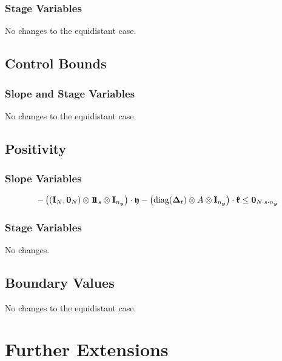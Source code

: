 \documentclass{article}
\newcommand{\kron}{\otimes}%
\newcommand{\diag}{\mathop{\mathrm{diag}}}%
\newcommand{\vectorfont}[1]{\boldsymbol{#1}}%
\newcommand{\greekvectorfont}[1]{\boldsymbol{#1}}%
\newcommand{\matrixfont}[1]{\mathbf{#1}}%
\newcommand{\yvec}{\vectorfont{y}}
\newcommand{\Deltavec}{\greekvectorfont{\Delta}}
\newcommand{\kfrakvec}{\vectorfont{\mathfrak{k}}}
\newcommand{\yfrakvec}{\vectorfont{\mathfrak{y}}}
\newcommand{\nullvec}{\greekvectorfont{0}}
\newcommand{\einsvec}{\vectorfont{1}\negthinspace\negthinspace\vectorfont{1}} %
\newcommand{\Imat}{\matrixfont{I}}%
\begin{document}
\subsubsection*{Stage Variables}
No changes to the equidistant case.


\subsection*{Control Bounds}
\subsubsection*{Slope and Stage Variables}
No changes to the equidistant case.


\subsection*{Positivity}
\subsubsection*{Slope Variables}
\[
- \left((\Imat_N, \nullvec_N)  \kron \einsvec_s  \kron \Imat_{n_{\yvec}}   \right)\cdot \yfrakvec
- \left( \diag(\Deltavec_t) \kron A \kron \Imat_{n_{\yvec}}  \right) \cdot \kfrakvec
\leq \nullvec_{N \cdot s \cdot n_{\yvec}}
\]
\subsubsection*{Stage Variables}
No changes.

\subsection*{Boundary Values}
No changes to the equidistant case.








\section*{Further Extensions}%
\end{document}
